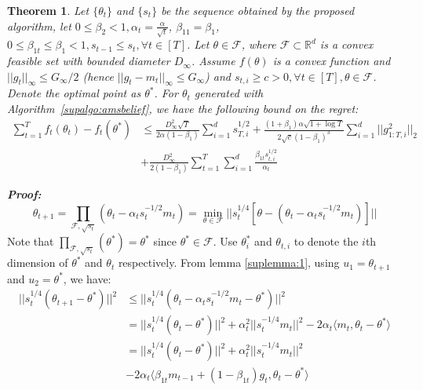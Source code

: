 \documentclass{article}
\newtheorem{theorem}{Theorem}[section]
\begin{document}
\begin{theorem}
\label{suptheorem:1}
Let $\{\theta_t\}$ and $\{s_t\}$ be the sequence obtained by the proposed algorithm, let $0 \leq \beta_2 < 1,\alpha_t = \frac{\alpha}{\sqrt{t}}$, $\beta_{11} = \beta_1$, $0 \leq \beta_{1t} \leq \beta_1 < 1, s_{t-1} \leq s_t, \forall t \in [T]$. %
Let $\theta \in \mathcal{F}$, where $\mathcal{F} \subset \mathbb{R}^d$ is a convex feasible set with bounded diameter $D_{\infty}$. Assume $f(\theta)$ is a convex function and $ \vert  \vert  g_t  \vert  \vert_\infty \leq G_\infty / 2$ (hence $ \vert  \vert  g_t - m_t  \vert  \vert_\infty \leq G_\infty$) and $s_{t,i} \geq c > 0, \forall t \in [T], \theta \in \mathcal{F}$. Denote the optimal point as $\theta^*$. For $\theta_t$ generated with Algorithm~\ref{supalgo:amsbelief}, we have the following bound on the regret: \\
\begin{align*}
\sum_{t=1}^T f_t(\theta_t) - f_t(\theta^*) & \leq \frac{D_\infty^2 \sqrt{T}}{2 \alpha (1-\beta_1)} \sum_{i=1}^d s_{T,i}^{1/2}
+  \frac{(1+\beta_1 )\alpha \sqrt{1 + \log T}}{2 \sqrt{c} (1 - \beta_1)^3} \sum_{i=1}^d \Big \vert \Big \vert g_{1:T,i}^2 \Big \vert \Big \vert_2 \nonumber \\
&+ \frac{D_\infty^2}{2 (1-\beta_{1})} \sum_{t=1}^T \sum_{i=1}^d \frac{\beta_{1t} s_{t,i}^{1/2} }{\alpha_t} 
\end{align*}
\end{theorem} 
\textbf{\textit{Proof:}}
\begin{equation*}
    \theta_{t+1} = \prod_{\mathcal{F}, \sqrt{s_t}}(\theta_t - \alpha_t s_t^{-1/2} m_t) = \operatorname*{min}_{\theta \in \mathcal{F}} \Big \vert \Big \vert s_t^{1/4}[\theta - (\theta_t - \alpha_t s_t^{-1/2}m_t)] \Big \vert \Big \vert
\end{equation*}
Note that $\prod_{\mathcal{F}, \sqrt{s_t}}(\theta^*) = \theta^*$ since $\theta^* \in \mathcal{F}$. Use $\theta^*_i$ and $\theta_{t,i}$ to denote the $i$th dimension of $\theta^*$ and $\theta_t$ respectively.
From lemma \eqref{suplemma:1}, using $u_1 = \theta_{t+1}$ and $u_2 = \theta^*$, we have:
\begin{align}
\label{supeq:1}
    \Big \vert \Big \vert s_t^{1/4}(\theta_{t+1} - \theta^*) \Big \vert \Big \vert^2 & \leq \Big \vert \Big \vert s_t^{1/4}(\theta_t - \alpha_t s_t^{-1/2}m_t - \theta^*) \Big \vert \Big \vert^2 \nonumber \\
    & =  \Big \vert \Big \vert s_t^{1/4}(\theta_t - \theta^*) \Big \vert \Big \vert^2 + \alpha_t^2 \Big \vert \Big \vert s_t^{-1/4}m_t \Big \vert \Big \vert^2 - 2 \alpha_t \langle m_t, \theta_t - \theta^* \rangle \nonumber \\
    &= \Big \vert \Big \vert s_t^{1/4}(\theta_t - \theta^*) \Big \vert \Big \vert^2 + \alpha_t^2 \Big \vert \Big \vert s_t^{-1/4}m_t \Big \vert \Big \vert^2 \nonumber \\
    &- 2 \alpha_t \langle \beta_{1t}m_{t-1} + (1 - \beta_{1t}) g_t, \theta_t - \theta^* \rangle
\end{align}
\end{document}
